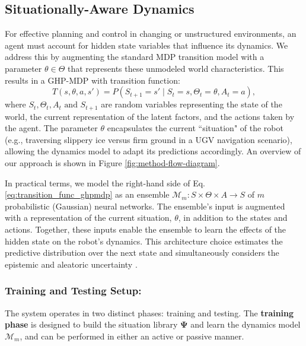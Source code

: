 \documentclass[Afour,sageh,times]{sagej}
\theoremstyle{lemma}
\begin{document}
\subsection{Situationally-Aware Dynamics}

For effective planning and control in changing or unstructured environments, an agent must account for hidden state variables that influence its dynamics. We address this by augmenting the standard MDP transition model with a parameter $\theta \in \Theta$ that represents these unmodeled world characteristics. This results in a GHP-MDP with transition function:
\begin{equation} \label{eq:transition_func_ghpmdp}
    T(s, \theta, a, s') = P(S_{t+1} = s' \mid S_t = s, \Theta_t = \theta, A_t = a),
\end{equation}
where $S_{t}, \Theta_t, A_t \text{ and } S_{t+1}$ are random variables representing the state of the world, the current representation of the latent factors, and the actions taken by the agent. The parameter $\theta$ encapsulates the current ``situation" of the robot (e.g., traversing slippery ice versus firm ground in a UGV navigation scenario), allowing the dynamics model to adapt its predictions accordingly. An overview of our approach is shown in Figure \ref{fig:method-flow-diagram}.

In practical terms, we model the right-hand side of Eq. \eqref{eq:transition_func_ghpmdp} as an ensemble $\mathcal{M}_m : S \times \Theta \times A \rightarrow S$ of $m$ probabilistic (Gaussian) neural networks. The ensemble's input is augmented with a representation of the current situation, $\theta$, in addition to the states and actions. Together, these inputs enable the ensemble to learn the effects of the hidden state on the robot's dynamics. This architecture choice estimates the predictive distribution over the next state and simultaneously considers the epistemic and aleatoric uncertainty \cite[]{chua2018deep}.

\subsubsection{Training and Testing Setup:} \label{sec:training_testing}

The system operates in two distinct phases: training and testing. The \textbf{training phase} is designed to build the situation library $\boldsymbol{\Psi}$ and learn the dynamics model $\mathcal{M}_m$, and can be performed in either an active or passive manner.
\end{document}
